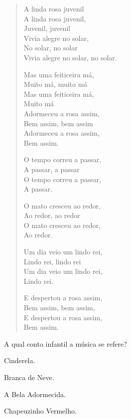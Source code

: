 \begin{verse}
A linda rosa juvenil\\
A linda rosa juvenil,\\
Juvenil, juvenil\\
Vivia alegre no solar,\\
No solar, no solar\\
Vivia alegre no solar, no solar.

Mas uma feiticeira má,\\
Muito má, muito má\\
Mas uma feiticeira má,\\
Muito má\\
Adormeceu a rosa assim,\\
Bem assim, bem assim\\
Adormeceu a rosa assim,\\
Bem assim.

O tempo correu a passar,\\
A passar, a passar\\
O tempo correu a passar,\\
A passar.

O mato cresceu ao redor,\\
Ao redor, ao redor\\
O mato cresceu ao redor,\\
Ao redor.

Um dia veio um lindo rei,\\
Lindo rei, lindo rei\\
Um dia veio um lindo rei,\\
Lindo rei.

E despertou a rosa assim,\\
Bem assim, bem assim,\\
E despertou a rosa assim,\\
Bem assim.
\end{verse}


A qual conto infantil a música se refere?

\begin{escolha}
\item Cinderela.

\item Branca de Neve.

\item A Bela Adormecida.

\item Chapeuzinho Vermelho.
\end{escolha}

